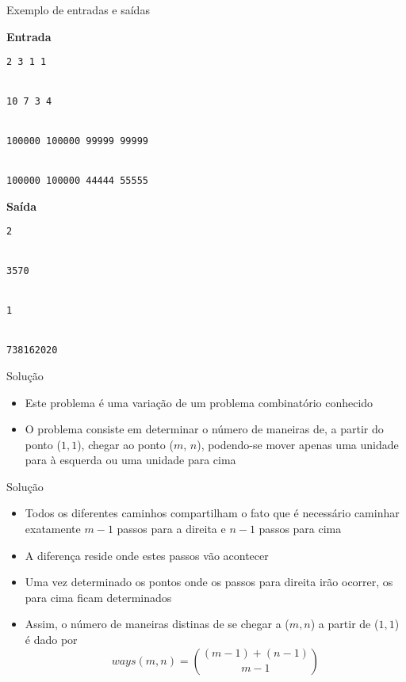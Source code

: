 \begin{frame}[fragile]{Exemplo de entradas e saídas}

\begin{minipage}[t]{0.55\textwidth}
\textbf{Entrada}
\begin{verbatim}
2 3 1 1


10 7 3 4


100000 100000 99999 99999


100000 100000 44444 55555
\end{verbatim}
\end{minipage}
\begin{minipage}[t]{0.4\textwidth}
\textbf{Saída}
\begin{verbatim}
2


3570


1


738162020
\end{verbatim}
\end{minipage}
\end{frame}

\begin{frame}[fragile]{Solução}

    \begin{itemize}
        \item Este problema é uma variação de um problema combinatório conhecido

        \item O problema consiste em determinar o número de maneiras de, a partir do ponto
            ($1, 1$), chegar ao ponto ($m$, $n$), podendo-se mover apenas uma unidade para à esquerda
                ou uma unidade para cima

            

    \end{itemize}

\end{frame}


\begin{frame}[fragile]{Solução}

    \begin{itemize}
        \item Todos os diferentes caminhos compartilham o fato que é necessário caminhar 
            exatamente $m - 1$ passos para a direita e $n - 1$ passos para cima

        \item A diferença reside onde estes passos vão acontecer

        \item Uma vez determinado os pontos onde os passos para direita irão ocorrer, os para
            cima ficam determinados

        \item Assim, o número de maneiras distinas de se chegar a ($m, n$) a partir de ($1, 1$)
            é dado por
        \[
            ways(m, n) = \binom{(m - 1) + (n - 1)}{m - 1}
        \]
    \end{itemize}

\end{frame}

